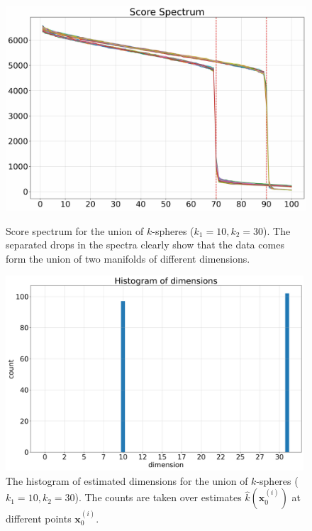   \begin{figure}[H]
   \begin{minipage}[t]{.45\textwidth}
       \centering
       \includegraphics[width=\linewidth]{chapter3/figures/union_of_spheres_spectrum.jpg}
       \caption{Score spectrum for the union of $k$-spheres ($k_1=10, k_2=30$). The separated drops in the spectra clearly show that the data comes form the union of two manifolds of different dimensions.}
       \label{ch3:fig:unions_spectrum}
   \end{minipage}
   \hspace{5mm}
   \begin{minipage}[t]{.45\textwidth}
      \centering
       \includegraphics[width=0.99\textwidth]{chapter3/figures/union_of_spheres_dims.png}
       \caption{The histogram of estimated dimensions for the union of $k$-spheres ($k_1=10, k_2=30$). The counts are taken over estimates $\hat{k}(\textbf{x}_0^{(i)})$ at different points $\textbf{x}_0^{(i)}$.}
       \label{ch3:fig:union_dims}
   \end{minipage}
   \end{figure}
   
